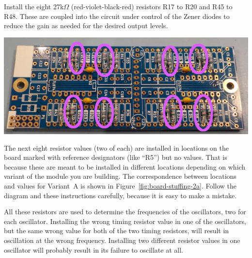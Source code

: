 Install the eight 27k$\Omega$ (red-violet-black-red) resistors R17 to R20
and R45 to R48.  These are coupled into the circuit under control of the
Zener diodes to reduce the gain as needed for the desired output levels.

\noindent\includegraphics[width=\linewidth]{res-27k.jpg}

The next eight resistor values (two of each) are installed in locations on
the board marked with reference designators (like ``R5'') but no values. 
That is because these are meant to be installed in different locations
depending on which variant of the module you are building.  The
correspondence between locations and values for Variant~A is shown in
Figure~\ref{fig:board-stuffing-2a}.  Follow the diagram and these
instructions carefully, because it is easy to make a mistake.

All these resistors are used to determine the frequencies of the
oscillators, two for each oscillator.  Installing the wrong timing resistor
value in one of the oscillators, but the same wrong value for both of the
two timing resistors, will result in oscillation at the wrong frequency. 
Installing two different resistor values in one oscillator will probably
result in its failure to oscillate at all.

\def\RVA{100k$\Omega$}\def\CVA{0.10$\mu$F}\def\TVA{63ms}\def\FVA{16Hz}
\def\RVB{150k$\Omega$}\def\CVB{0.22$\mu$F}\def\TVB{210ms}\def\FVB{4.8Hz}
\def\RVC{1.2M$\Omega$}\def\CVC{0.10$\mu$F}\def\TVC{750ms}\def\FVC{1.3Hz}
\def\RVD{1.0M$\Omega$}\def\CVD{0.22$\mu$F}\def\TVD{1.4s}\def\FVD{720mHz}
\def\RVE{390k$\Omega$}\def\CVE{1.0$\mu$F}\def\TVE{2.4s}\def\FVE{410mHz}
\def\RVF{1.8M$\Omega$}\def\CVF{0.47$\mu$F}\def\TVF{5.3s}\def\FVF{190mHz}
\def\RVG{5.6M$\Omega$}\def\CVG{0.47$\mu$F}\def\TVG{16s}\def\FVG{60mHz}
\def\RVH{10M$\Omega$}\def\CVH{1.0$\mu$F}\def\TVH{63s}\def\FVH{16mHz}

